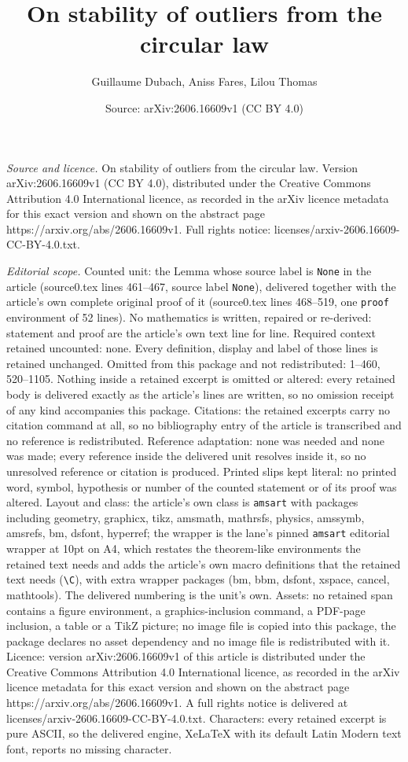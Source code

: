 \documentclass[10pt,a4paper]{amsart}
\title[On stability of outliers from the circular law]{On stability of outliers from the circular law}
\author{Guillaume Dubach, Aniss Fares, Lilou Thomas}
\date{Source: arXiv:2606.16609v1 (CC BY 4.0)}
\begin{document}
\maketitle

\noindent\emph{Source and licence.} On stability of outliers from the circular law. Version arXiv:2606.16609v1 (CC BY 4.0), distributed under the Creative Commons Attribution 4.0 International licence, as recorded in the arXiv licence metadata for this exact version and shown on the abstract page https://arxiv.org/abs/2606.16609v1. Full rights notice: licenses/arxiv-2606.16609-CC-BY-4.0.txt.\par\smallskip

\noindent\textit{Editorial scope.} Counted unit: the Lemma whose source label is \texttt{None} in the article (source0.tex lines 461--467, source label \texttt{None}), delivered together with the article's own complete original proof of it (source0.tex lines 468--519, one \texttt{proof} environment of 52 lines). No mathematics is written, repaired or re-derived: statement and proof are the article's own text line for line. Required context retained uncounted: none. Every definition, display and label of those lines is retained unchanged. Omitted from this package and not redistributed: 1--460, 520--1105. Nothing inside a retained excerpt is omitted or altered: every retained body is delivered exactly as the article's lines are written, so no omission receipt of any kind accompanies this package. Citations: the retained excerpts carry no citation command at all, so no bibliography entry of the article is transcribed and no reference is redistributed. Reference adaptation: none was needed and none was made; every reference inside the delivered unit resolves inside it, so no unresolved reference or citation is produced. Printed slips kept literal: no printed word, symbol, hypothesis or number of the counted statement or of its proof was altered. Layout and class: the article's own class is \texttt{amsart} with packages including geometry, graphicx, tikz, amsmath, mathrsfs, physics, amssymb, amsrefs, bm, dsfont, hyperref; the wrapper is the lane's pinned \texttt{amsart} editorial wrapper at 10pt on A4, which restates the theorem-like environments the retained text needs and adds the article's own macro definitions that the retained text needs (\texttt{\textbackslash C}), with extra wrapper packages (bm, bbm, dsfont, xspace, cancel, mathtools). The delivered numbering is the unit's own. Assets: no retained span contains a figure environment, a graphics-inclusion command, a PDF-page inclusion, a table or a TikZ picture; no image file is copied into this package, the package declares no asset dependency and no image file is redistributed with it. Licence: version arXiv:2606.16609v1 of this article is distributed under the Creative Commons Attribution 4.0 International licence, as recorded in the arXiv licence metadata for this exact version and shown on the abstract page https://arxiv.org/abs/2606.16609v1. A full rights notice is delivered at licenses/arxiv-2606.16609-CC-BY-4.0.txt. Characters: every retained excerpt is pure ASCII, so the delivered engine, XeLaTeX with its default Latin Modern text font, reports no missing character.
\end{document}
